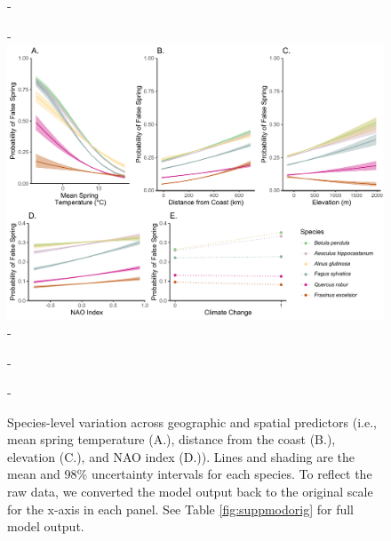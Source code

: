 \documentclass{article}\usepackage[]{graphicx}\usepackage[]{color}
\begin{document}
{\begin{figure} [H]
  -\begin{center}
  -\includegraphics[width=16cm]{..//analyses/figures/InteractionPlots/Species_orig_98.pdf}
  -\caption{Species-level variation across geographic and spatial predictors (i.e., mean spring temperature (A.), distance from the coast (B.), elevation (C.), and NAO index (D.)). Lines and shading are the mean and 98\% uncertainty intervals for each species. To reflect the raw data, we converted the model output back to the original scale for the x-axis in each panel. See Table \ref{fig:suppmodorig} for full model output. }\label{fig:spp}
  -\end{center}
  -\end{figure}}
  
\end{document}
